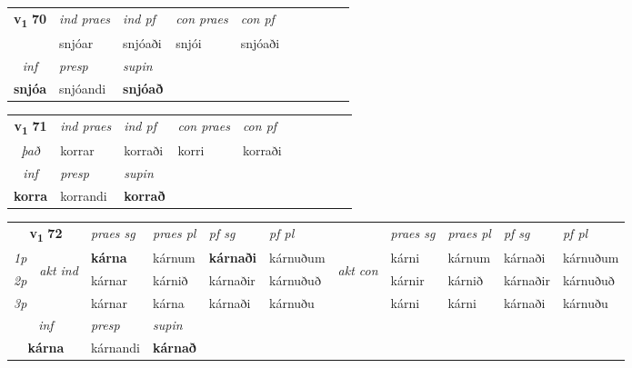 \noindent
\begin{tabular}{lllllllllll} \toprule
\multicolumn{2}{c}{\textbf{v{\textsubscript{1}}} \Large{\textbf{70}}}  &  \textit{ind praes} & \textit{ind pf} & \textit{con praes} & \textit{con pf} \\*
\multicolumn{2}{c}{ \textit{\specialcell{e-m\\það}} } & snjóar & snjóaði & snjói & snjóaði \\*

\cmidrule{3-4}
   \multicolumn{2}{c}{\textit{inf}}     & \textit{presp} & \textit{supin}   \\*
  \multicolumn{2}{c}{\textbf{snjóa}}      & snjóandi &  \textbf{snjóað}   \\*
\end{tabular}

\noindent
\begin{tabular}{lllllllllll} \toprule
\multicolumn{2}{c}{\textbf{v{\textsubscript{1}}} \Large{\textbf{71}}}  &  \textit{ind praes} & \textit{ind pf} & \textit{con praes} & \textit{con pf} \\*
\multicolumn{2}{c}{ \textit{það} } & korrar & korraði & korri & korraði \\*

\cmidrule{3-4}
   \multicolumn{2}{c}{\textit{inf}}     & \textit{presp} & \textit{supin}   \\*
  \multicolumn{2}{c}{\textbf{korra}}      & korrandi &  \textbf{korrað}   \\*
\end{tabular}

\noindent
\begin{tabular}{lllllllllll} \toprule
\multicolumn{2}{c}{\textbf{v{\textsubscript{1}}} \Large{\textbf{72}}}  &  \textit{praes sg}  & \textit{praes pl}  &\textit{ pf sg} & \textit{pf pl} &  &  \textit{praes sg}  & \textit{praes pl}  & \textit{pf sg} & \textit{pf pl } \\*
	\cmidrule{3-6} \cmidrule{8-11}
 {\textit{1p}} & \multirow{3}{*}{\begin{turn}{90}\textit{akt ind}\end{turn}} & \textbf{kárna} & kárnum & \textbf{kárnaði} & kárnuðum & \multirow{3}{*}{\begin{turn}{90}\textit{akt con}\end{turn}} &kárni & kárnum & kárnaði & kárnuðum\\*
 {\textit{2p}} &  &  kárnar  & kárnið & kárnaðir & kárnuðuð & & kárnir & kárnið & kárnaðir & kárnuðuð \\*
{\textit{3p}} &  & kárnar & kárna & kárnaði & kárnuðu & & kárni & kárni& kárnaði & kárnuðu \\*
\cmidrule{3-6} \cmidrule{8-11}

   \multicolumn{2}{c}{\textit{inf}}     & \textit{presp} & \textit{supin}   \\*
  \multicolumn{2}{c}{\textbf{kárna}}      & kárnandi &  \textbf{kárnað}   \\*
\end{tabular}

